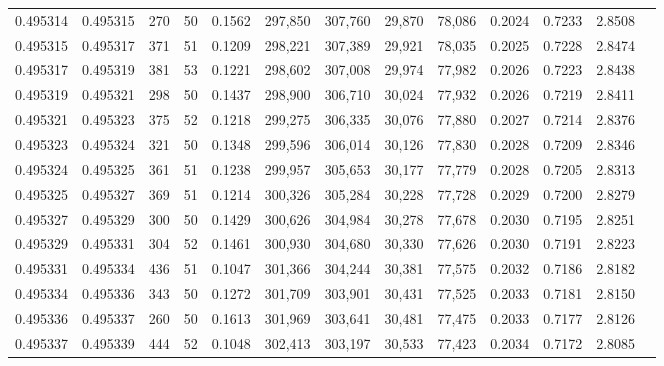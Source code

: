 \begin{tabular}{rrrrrrrrrrrrr}
0.495314 & 0.495315 &   270 &  50 &                                     0.1562 & 297,850 & 307,760 &  29,870 &  78,086 & 0.2024 & 0.7233 & 2.8508 \\
0.495315 & 0.495317 &   371 &  51 &                                     0.1209 & 298,221 & 307,389 &  29,921 &  78,035 & 0.2025 & 0.7228 & 2.8474 \\
0.495317 & 0.495319 &   381 &  53 &                                     0.1221 & 298,602 & 307,008 &  29,974 &  77,982 & 0.2026 & 0.7223 & 2.8438 \\
0.495319 & 0.495321 &   298 &  50 &                                     0.1437 & 298,900 & 306,710 &  30,024 &  77,932 & 0.2026 & 0.7219 & 2.8411 \\
0.495321 & 0.495323 &   375 &  52 &                                     0.1218 & 299,275 & 306,335 &  30,076 &  77,880 & 0.2027 & 0.7214 & 2.8376 \\
0.495323 & 0.495324 &   321 &  50 &                                     0.1348 & 299,596 & 306,014 &  30,126 &  77,830 & 0.2028 & 0.7209 & 2.8346 \\
0.495324 & 0.495325 &   361 &  51 &                                     0.1238 & 299,957 & 305,653 &  30,177 &  77,779 & 0.2028 & 0.7205 & 2.8313 \\
0.495325 & 0.495327 &   369 &  51 &                                     0.1214 & 300,326 & 305,284 &  30,228 &  77,728 & 0.2029 & 0.7200 & 2.8279 \\
0.495327 & 0.495329 &   300 &  50 &                                     0.1429 & 300,626 & 304,984 &  30,278 &  77,678 & 0.2030 & 0.7195 & 2.8251 \\
0.495329 & 0.495331 &   304 &  52 &                                     0.1461 & 300,930 & 304,680 &  30,330 &  77,626 & 0.2030 & 0.7191 & 2.8223 \\
0.495331 & 0.495334 &   436 &  51 &                                     0.1047 & 301,366 & 304,244 &  30,381 &  77,575 & 0.2032 & 0.7186 & 2.8182 \\
0.495334 & 0.495336 &   343 &  50 &                                     0.1272 & 301,709 & 303,901 &  30,431 &  77,525 & 0.2033 & 0.7181 & 2.8150 \\
0.495336 & 0.495337 &   260 &  50 &                                     0.1613 & 301,969 & 303,641 &  30,481 &  77,475 & 0.2033 & 0.7177 & 2.8126 \\
0.495337 & 0.495339 &   444 &  52 &                                     0.1048 & 302,413 & 303,197 &  30,533 &  77,423 & 0.2034 & 0.7172 & 2.8085 \\

\end{tabular}
